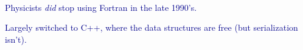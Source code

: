 \documentclass[aspectratio=169]{beamer}
\begin{document}
\begin{frame}{\mbox{ }}
\vspace{1 cm}
\Large
\begin{center}
\begin{minipage}{0.8\linewidth}
\textcolor{darkblue}{Physicists {\it did} stop using Fortran in the late 1990's.}

\vspace{0.5 cm}
\textcolor{darkblue}{Largely switched to C++, where the data structures are free (but serialization isn't).}

\vspace{0.5 cm}
\end{minipage}
\end{center}
\vspace{1 cm}
\end{frame}
\end{document}
